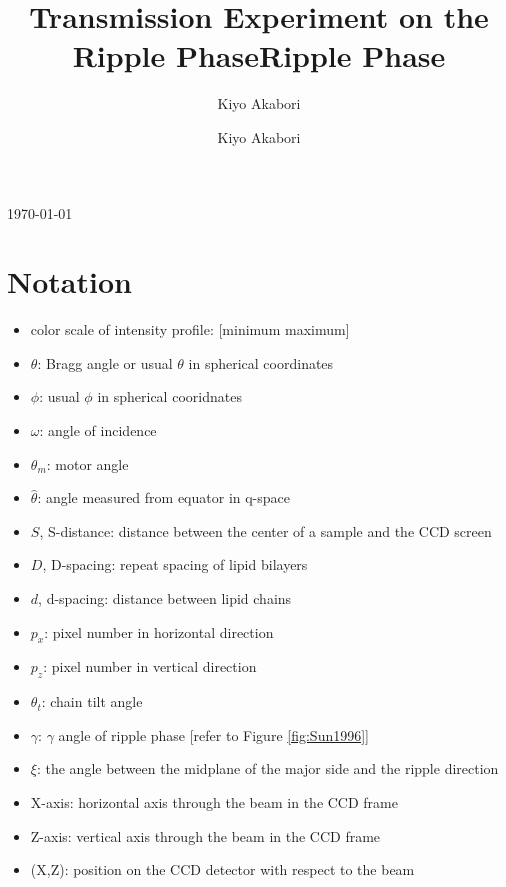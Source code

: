 \documentclass[letterpaper,12pt]{article}
\author{Kiyo Akabori}
\title{Transmission Experiment on the Ripple Phase}
\begin{document}
\title{Ripple Phase}
\author{Kiyo Akabori}
\today

\tableofcontents
\listoffigures
\listoftables

\newpage
\section{Notation}
\begin{itemize}
\item color scale of intensity profile: [minimum maximum]
\item $\theta$: Bragg angle or usual $\theta$ in spherical coordinates
\item $\phi$: usual $\phi$ in spherical cooridnates
\item $\omega$: angle of incidence
\item $\theta_m$: motor angle
\item $\hat{\theta}$: angle measured from equator in q-space
\item $S$, S-distance: distance between the center of a sample and the CCD screen
\item $D$, D-spacing: repeat spacing of lipid bilayers
\item $d$, d-spacing: distance between lipid chains
\item $p_x$: pixel number in horizontal direction
\item $p_z$: pixel number in vertical direction
\item $\theta_t$: chain tilt angle
\item $\gamma$: $\gamma$ angle of ripple phase [refer to Figure \ref{fig:Sun1996}]
\item $\xi$: the angle between the midplane of the major side and the ripple direction
\item X-axis: horizontal axis through the beam in the CCD frame
\item Z-axis: vertical axis through the beam in the CCD frame
\item (X,Z): position on the CCD detector with respect to the beam
\end{itemize}

\newpage
\end{document}
